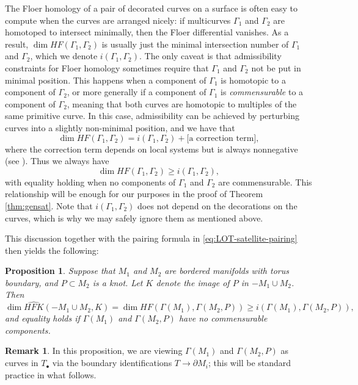 \documentclass[11pt]{amsart}
\newtheorem {proposition}[theorem]{Proposition}
\numberwithin{equation}{section}
\numberwithin{theorem}{section}
\theoremstyle{definition}
\newtheorem{remark}[theorem]{Remark}
\newcommand\HFK{\widehat{\mathit{HFK}}}
\newcommand{\HF}{\mathit{HF}}
\begin{document}
The Floer homology of a pair of decorated curves on a surface is often easy to compute when the curves are arranged nicely: if multicurves $\Gamma_1$ and $\Gamma_2$ are homotoped to intersect minimally, then the Floer differential vanishes. As a result,  $\dim \HF(\Gamma_1, \Gamma_2)$ is usually just the minimal intersection number of $\Gamma_1$ and $\Gamma_2$, which we denote $i(\Gamma_1, \Gamma_2)$. The only caveat is that admissibility constraints for Floer homology sometimes require that $\Gamma_1$ and $\Gamma_2$ not be put in minimal position. This happens when a component of $\Gamma_1$ is homotopic to a component of $\Gamma_2$, or more generally if a component of $\Gamma_1$ is \emph{commensurable} to a component of $\Gamma_2$, meaning that both curves are homotopic to multiples of the same primitive curve. In this case, admissibility can be achieved by perturbing curves into a slightly non-minimal position, and we have that
\[ \dim \HF(\Gamma_1, \Gamma_2) = i(\Gamma_1, \Gamma_2) + \text{[a correction term]}, \]
where the correction term depends on local systems but is always nonnegative (see \cite[Corollary 4.10]{hrw}). Thus we always have
\[ \dim \HF(\Gamma_1, \Gamma_2) \ge i(\Gamma_1, \Gamma_2), \]
with equality holding when no components of $\Gamma_1$ and $\Gamma_2$ are commensurable. This relationship will be enough for our purposes in the proof of Theorem \ref{thm:gensat}. Note that $i(\Gamma_1, \Gamma_2)$ does not depend on the decorations on the curves, which is why we may safely ignore them as mentioned above.

This discussion together with the pairing formula in \eqref{eq:LOT-satellite-pairing} then yields the following:

\begin{proposition}\label{prop:curves-pairing}
Suppose  that $M_1$ and $M_2$ are  bordered manifolds with torus boundary, and  $P\subset M_2$ is a knot. Let $K$ denote the image of $P$ in $-M_1\cup M_2$. Then
\[ \dim \HFK(-M_1\cup M_2, K) = \dim \HF( \Gamma(M_1), \Gamma(M_2, P) ) \ge i( \Gamma(M_1), \Gamma(M_2, P) ), \]
and equality holds if $\Gamma(M_1)$ and $\Gamma(M_2, P)$ have no commensurable components.
\end{proposition}

\begin{remark}
\label{rmk:commen}
In this proposition, we are viewing $\Gamma(M_1)$ and $\Gamma(M_2, P)$ as curves in $T_\bullet$ via the boundary identifications $T\to\partial{M_i}$; this will be standard practice in what follows.
\end{remark}
\end{document}
